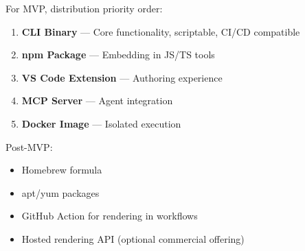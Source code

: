 For MVP, distribution priority order:

\begin{enumerate}
  \item \textbf{CLI Binary} — Core functionality, scriptable, CI/CD compatible
  \item \textbf{npm Package} — Embedding in JS/TS tools
  \item \textbf{VS Code Extension} — Authoring experience
  \item \textbf{MCP Server} — Agent integration
  \item \textbf{Docker Image} — Isolated execution
\end{enumerate}

Post-MVP:
\begin{itemize}
  \item Homebrew formula
  \item apt/yum packages
  \item GitHub Action for rendering in workflows
  \item Hosted rendering API (optional commercial offering)
\end{itemize}
